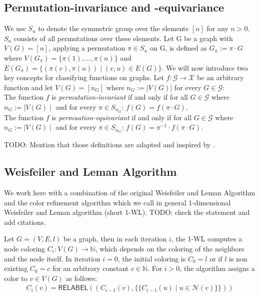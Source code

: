 \documentclass[11pt, dvipsnames, DIV=12]{scrreprt}
\theoremstyle{definition}
\newcommand{\MSopen}{\{\!\!\{}
\newcommand{\MSclose}{\}\!\!\}}
\begin{document}
\subsection{Permutation-invariance and -equivariance}
We use $S_n$ to denote the symmetric group over the elements $[n]$ for any $n > 0$. $S_n$ consists of all permutations over these elements. Let G be a graph with $V(G) = [n]$, applying a permutation $\pi \in S_n$ on G, is defined as $G_\pi := \pi \cdot G$ where $V(G_\pi) = \{\pi(1), \ldots, \pi(n) \}$ and $E(G_\pi) = \{ (\pi(v), \pi(u)) \mid (v,u) \in E(G)\}$. We will now introduce two key concepts for classifying functions on graphs. Let $f: \mathcal{G} \rightarrow \mathcal{X}$ be an arbitrary function and let $V(G) = [n_G]$ where $n_G := |V(G)|$ for every $G \in \mathcal{G}$:\\
\noindent The function $f$ is \textit{permutation-invariant} if and only if for all $G \in \mathcal{G}$ where $n_G := \mid V(G) \mid$ and for every $\pi \in S_{n_G}$: $f(G) = f(\pi \cdot G)$.\\
\noindent The function $f$ is \textit{permuation-equivariant} if and only if for all $G \in \mathcal{G}$ where $n_G := \mid V(G) \mid$ and for every $\pi \in S_{n_G}$: $f(G) = \pi^{-1} \cdot f(\pi \cdot G)$.

TODO: Mention that those definitions are adapted and inspired by \cite{Morris2021}.

\subsection{Weisfeiler and Leman Algorithm}
We work here with a combination of the original Weisfeiler and Leman Algorithm and the color refinement algorithm which we call in general 1-dimensional Weisfeiler and Leman algorithm (short 1-WL). TODO: check the statement and add citations.

Let $G = (V,E,l)$ be a graph, then in each iteration $i$, the 1-WL computes a node coloring $C_i: V(G) \rightarrow \mathbb{N}$, which depends on the coloring of the neighbors and the node itself. In iteration $i=0$, the initial coloring is $C_0 = l$ or if $l$ is non existing $C_0 = c$ for an arbitrary constant $c \in \mathbb{N}$. For $i > 0$, the algorithm assigns a color to $v \in V(G)$ as follows:
\begin{align*}
C_i (v) = \textsf{RELABEL}((C_{i-1}(v), \MSopen C_{i-1}(u) \mid u \in \mathcal{N}(v) \MSclose))
\end{align*}
\end{document}
